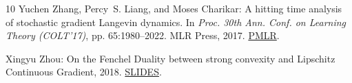 \begin{thebibliography}{10}
{\sc Yuchen Zhang, Percy~S. Liang, and Moses Charikar}: A hitting time analysis
  of stochastic gradient {L}angevin dynamics.
\newblock In {\em Proc. 30th Ann. Conf. on Learning Theory (COLT'17)}, pp.
  65:1980--2022. MLR Press, 2017.
\newblock \href{http://proceedings.mlr.press/v65/zhang17b.html}{PMLR}.

{\sc Xingyu Zhou}: On the {F}enchel {D}uality between strong convexity and
  {L}ipschitz {C}ontinuous {G}radient, 2018.
\newblock \href{https://xingyuzhou.org/talks/Fenchel_duality.pdf}{SLIDES}.

\end{thebibliography}